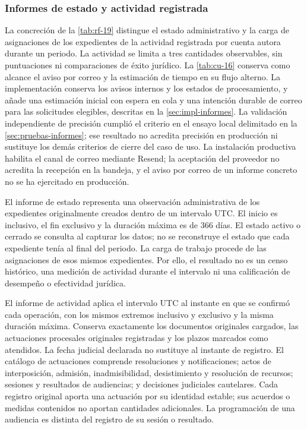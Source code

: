 \subsubsection{Informes de estado y actividad registrada}\label{sec:diseno-informes}

La concreción de la \cref{tab:rf-19} distingue el estado administrativo y la carga
de asignaciones de los expedientes de la actividad registrada por cuenta autora
durante un periodo. La actividad se limita a tres cantidades observables, sin
puntuaciones ni comparaciones de éxito jurídico. La \cref{tab:cu-16} conserva
como alcance el aviso por correo y la estimación de tiempo en su flujo alterno.
La implementaci\'on conserva los avisos internos y los estados de procesamiento,
y a\~nade una estimaci\'on inicial con espera en cola y una intenci\'on durable de
correo para las solicitudes elegibles, descritas en la \cref{sec:impl-informes}.
La validaci\'on independiente de precisi\'on cumpli\'o el criterio en el ensayo
local delimitado en la \cref{sec:pruebas-informes}; ese resultado no acredita
precisi\'on en producci\'on ni sustituye los dem\'as criterios de cierre del caso
de uso. La instalaci\'on productiva habilita el canal de correo mediante Resend;
la aceptaci\'on del proveedor no acredita la recepci\'on en la bandeja, y el aviso
por correo de un informe concreto no se ha ejercitado en producci\'on.

El informe de estado representa una observación administrativa de los expedientes
originalmente creados dentro de un intervalo UTC. El inicio es inclusivo, el
fin exclusivo y la duración máxima es de 366 días. El estado activo o cerrado
se consulta al capturar los datos; no se reconstruye el estado que cada
expediente tenía al final del periodo. La carga de trabajo procede de las
asignaciones de esos mismos expedientes. Por ello, el resultado no es un censo
histórico, una medición de actividad durante el intervalo ni una calificación
de desempeño o efectividad jurídica.

El informe de actividad aplica el intervalo UTC al instante en que se confirmó
cada operación, con los mismos extremos inclusivo y exclusivo y la misma duración
máxima. Conserva exactamente los documentos originales cargados, las actuaciones
procesales originales registradas y los plazos marcados como atendidos. La fecha
judicial declarada no sustituye al instante de registro. El catálogo de actuaciones
comprende resoluciones y notificaciones; actos de interposición, admisión,
inadmisibilidad, desistimiento y resolución de recursos; sesiones y resultados
de audiencias; y decisiones judiciales cautelares. Cada registro original aporta
una actuación por su identidad estable; sus acuerdos o medidas contenidos no
aportan cantidades adicionales. La programación de una audiencia es distinta
del registro de su sesión o resultado.

